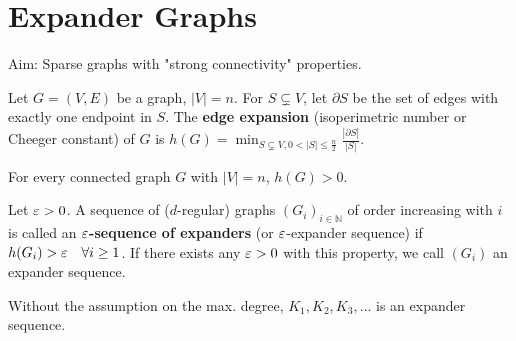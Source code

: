 \section{Expander Graphs}
Aim: Sparse graphs with "strong connectivity" properties.\\
\begin{definition}\label{9.1}
    Let $G=(V,E)$ be a graph, $|V|=n$. For $S\subsetneq V$, let $\partial S$ be the set of edges with exactly one endpoint in $S$. The \textbf{edge expansion} (isoperimetric number or Cheeger constant) of $G$ is $h(G)=\min_{S\subsetneq V, 0<|S|\leq \frac{n}{2}} \frac{|\partial S|}{|S|}$.
\begin{center}
    \end{center}
\end{definition}
\begin{remark}\label{9.2}
    For every connected graph $G$ with $|V|=n$, $h(G)>0$.
\end{remark}
\begin{definition}\label{9.3}
    Let $\varepsilon>0$. A sequence of ($d$-regular) graphs $(G_i)_{i\in\mathbb{N}}$ of order increasing with $i$ is called an \textbf{$\varepsilon$-sequence of expanders} (or $\varepsilon$-expander sequence) if $h(G_i)>\varepsilon\quad \forall i\geq 1$. If there exists any $\varepsilon>0$ with this property, we call $(G_i)$ an expander sequence.
\end{definition}
\begin{remark}\label{9.4}
    Without the assumption on the max. degree, $K_1,K_2,K_3,\ldots$ is an expander sequence.
\end{remark}
